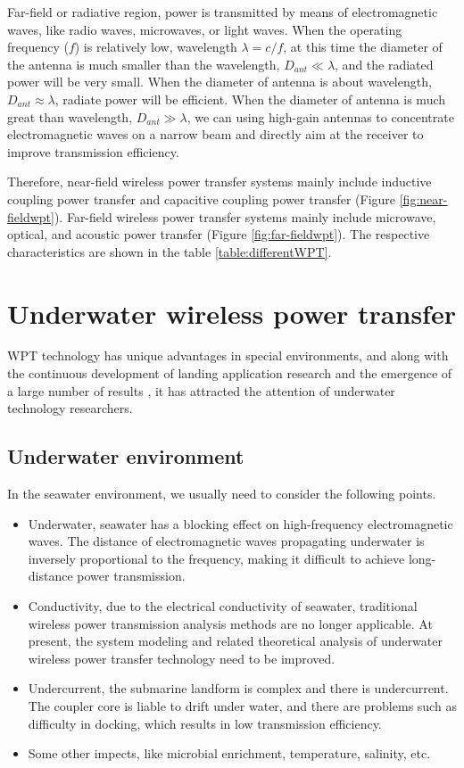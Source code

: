 Far-field or radiative region, power is transmitted by means of electromagnetic waves, like radio waves, microwaves, or light waves. When the operating frequency ($f$) is relatively low, wavelength $\lambda = c/f$, at this time the diameter of the antenna is much smaller than the wavelength, $D_{ant} \ll \lambda$, and the radiated power will be very small. When the diameter of antenna is about wavelength, $D_{ant} \approx \lambda$, radiate power will be efficient. When the diameter of antenna is much great than wavelength, $D_{ant} \gg \lambda$, we can using high-gain antennas to concentrate electromagnetic waves on a narrow beam and directly aim at the receiver to improve transmission efficiency.


Therefore, near-field wireless power transfer systems mainly include inductive coupling power transfer and capacitive coupling power transfer (Figure \ref{fig:near-fieldwpt}). Far-field wireless power transfer systems mainly include microwave, optical, and acoustic power transfer (Figure \ref{fig:far-fieldwpt}).  The respective characteristics are shown in the table \ref{table:differentWPT}.


\section{Underwater wireless power transfer}
WPT technology has unique advantages in special environments, and along with the continuous development of landing application research and the emergence of a large number of results \cite{Zhang2019}, it has attracted the attention of underwater technology researchers. 
\subsection{Underwater environment}
In the seawater environment, we usually need to consider the following points.

\begin{itemize}
    \item Underwater, seawater has a blocking effect on high-frequency electromagnetic waves. The distance of electromagnetic waves propagating underwater is inversely proportional to the frequency, making it difficult to achieve long-distance power transmission.
    \item Conductivity, due to the electrical conductivity of seawater, traditional wireless power transmission analysis methods are no longer applicable. At present, the system modeling and related theoretical analysis of underwater wireless power transfer technology need to be improved.
    \item Undercurrent, the submarine landform is complex and there is undercurrent. The coupler core is liable to drift under water, and there are problems such as difficulty in docking, which results in low transmission efficiency.
    \item Some other impects, like microbial enrichment, temperature, salinity, etc.
    
\end{itemize}


